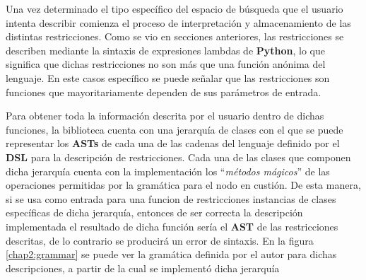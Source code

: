 Una vez determinado el tipo específico del espacio de búsqueda que el usuario intenta describir comienza
el proceso de interpretación y almacenamiento de las distintas restricciones. Como se vio en secciones
anteriores, las restricciones se describen mediante la sintaxis de expresiones lambdas de {\bf Python}, lo que
significa que dichas restricciones no son más que una función anónima del lenguaje. En este casos específico
se puede señalar que las restricciones son funciones que mayoritariamente dependen de sus parámetros de entrada.

Para obtener toda la información descrita por el usuario dentro de dichas funciones, la biblioteca cuenta con
una jerarquía de clases con el que se puede representar los {\bf ASTs} de cada una de las cadenas del lenguaje definido
por el {\bf DSL} para la descripción de restricciones. Cada una de las clases que componen dicha jerarquía cuenta con
la implementación los ``{\it métodos mágicos}'' de las operaciones permitidas por la gramática para el nodo en custión. De esta manera,
si se usa como entrada para una funcion de restricciones instancias de clases específicas de dicha jerarquía,
entonces de ser correcta la descripción implementada el resultado de dicha función sería el {\bf AST} de las restricciones
descritas, de lo contrario se producirá un error de sintaxis. En la figura \ref{chap2:grammar} se puede ver la gramática definida por
el autor para dichas descripciones, a partir de la cual se implementó dicha jerarquía



